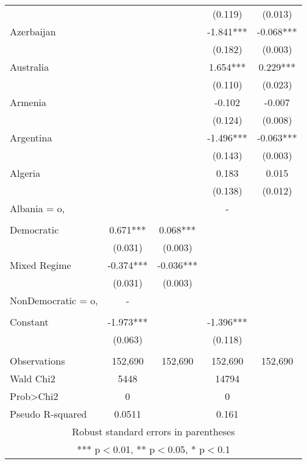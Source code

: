 \documentclass[]{article}
\begin{document}
\begin{tabular}{lcccc}
 &  &  & (0.119) & (0.013) \\
Azerbaijan &  &  & -1.841*** & -0.068*** \\
 &  &  & (0.182) & (0.003) \\
Australia &  &  & 1.654*** & 0.229*** \\
 &  &  & (0.110) & (0.023) \\
Armenia &  &  & -0.102 & -0.007 \\
 &  &  & (0.124) & (0.008) \\
Argentina &  &  & -1.496*** & -0.063*** \\
 &  &  & (0.143) & (0.003) \\
Algeria &  &  & 0.183 & 0.015 \\
 &  &  & (0.138) & (0.012) \\
Albania = o, &  &  & - &  \\
 &  &  &  &  \\
Democratic & 0.671*** & 0.068*** &  &  \\
 & (0.031) & (0.003) &  &  \\
Mixed Regime & -0.374*** & -0.036*** &  &  \\
 & (0.031) & (0.003) &  &  \\
NonDemocratic = o, & - &  &  &  \\
 &  &  &  &  \\
Constant & -1.973*** &  & -1.396*** &  \\
 & (0.063) &  & (0.118) &  \\
 &  &  &  &  \\
Observations & 152,690 & 152,690 & 152,690 & 152,690 \\
Wald Chi2 & 5448 &  & 14794 &  \\
Prob>Chi2 & 0 &  & 0 &  \\
 Pseudo R-squared & 0.0511 &  & 0.161 &  \\ \hline
\multicolumn{5}{c}{ Robust standard errors in parentheses} \\
\multicolumn{5}{c}{ *** p$<$0.01, ** p$<$0.05, * p$<$0.1} \\
\end{tabular}
\end{document}

